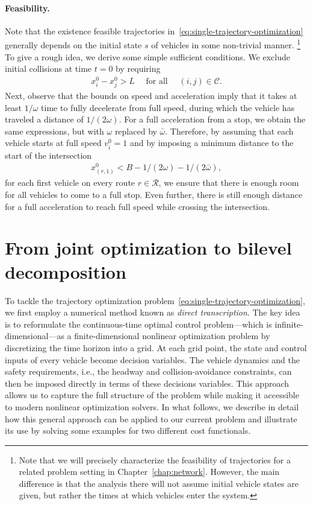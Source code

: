 \documentclass[a4paper]{report}
\theoremstyle{definition}
\theoremstyle{plain}
\begin{document}
\paragraph{Feasibility.}

Note that the existence feasible trajectories in~\eqref{eq:single-trajectory-optimization} generally depends on the
initial state $s$ of vehicles in some non-trivial manner.%
\footnote{Note that we will precisely characterize the feasibility of trajectories for a
related problem setting in Chapter~\ref{chap:network}.
%
However, the main difference is that the analysis there will not assume initial vehicle
states are given, but rather the times at which vehicles enter the system.}
%
To give a rough idea, we derive some simple sufficient conditions.
We exclude initial collisions at time $t=0$ by requiring
\begin{align}\label{eq:room-assumption}
 x_{i}^{0} - x_{j}^{0} > L \quad \text{ for all } \quad  (i,j) \in \mathcal{C} .
\end{align}
%
%
Next, observe that the bounds on speed and acceleration imply that it takes at
least $1/\omega$ time to fully decelerate from full speed, during which the vehicle
has traveled a distance of $1/(2\omega)$. For a full acceleration from a stop, we
obtain the same expressions, but with $\omega$ replaced by $\bar{\omega}$.
%
Therefore, by assuming that each vehicle starts at full speed $v_{i}^{0} = 1$
and by imposing a minimum distance to the start of the intersection
\begin{align}
  x_{(r,1)}^{0} < B - 1/(2\omega) - 1/(2\bar{\omega}),
\end{align}
for each first vehicle on every route
$r \in \mathcal{R}$, we ensure that there is enough room for all vehicles to
come to a full stop. Even further, there is still enough distance for a full
acceleration to reach full speed while crossing the intersection.


\section{From joint optimization to bilevel decomposition}

To tackle the trajectory optimization
problem~\eqref{eq:single-trajectory-optimization}, we first employ a numerical
method known as \emph{direct transcription}.
%
The key idea is to reformulate the continuous-time optimal control
problem---which is infinite-dimensional---as a finite-dimensional nonlinear
optimization problem by discretizing the time horizon into a grid.
%
At each grid point, the state and control inputs of every vehicle become
decision variables. The vehicle dynamics and the safety requirements, i.e., the
headway and collision-avoidance constraints, can then be imposed directly in
terms of these decisions variables.
%
This approach allows us to capture the full structure of the problem while
making it accessible to modern nonlinear optimization solvers.
%
In what follows, we describe in detail how this general approach can be applied
to our current problem and illustrate its use by solving some examples for two
different cost functionals.
\end{document}
